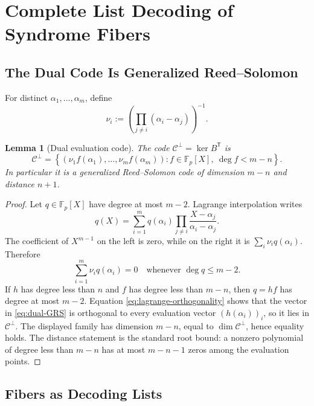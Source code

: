 \documentclass[10pt,a4paper]{amsart}
\newtheorem{lemma}[theorem]{Lemma}
\newcommand{\F}{\mathbb{F}}
\newcommand{\C}{\mathcal{C}}
\begin{document}
\section{Complete List Decoding of Syndrome Fibers}

\subsection{The Dual Code Is Generalized Reed--Solomon}

For distinct $\alpha_1,\ldots,\alpha_m$, define
\begin{equation}
   \nu_i:=\left(\prod_{j\ne i}(\alpha_i-\alpha_j)\right)^{-1}.
   \label{eq:dual-multipliers}
\end{equation}

\begin{lemma}[Dual evaluation code]
\label{lem:dual-GRS}
The code $\C^\perp=\ker B^{\mathsf T}$ is
\begin{equation}
   \C^\perp
   =\left\{(\nu_1f(\alpha_1),\ldots,\nu_mf(\alpha_m)):
       f\in\F_p[X],\ \deg f<m-n\right\}.
   \label{eq:dual-GRS}
\end{equation}
In particular it is a generalized Reed--Solomon code of dimension $m-n$ and distance $n+1$.
\end{lemma}

\begin{proof}
Let $q\in\F_p[X]$ have degree at most $m-2$.  Lagrange interpolation writes
\[
   q(X)=\sum_{i=1}^m q(\alpha_i)
        \prod_{j\ne i}\frac{X-\alpha_j}{\alpha_i-\alpha_j}.
\]
The coefficient of $X^{m-1}$ on the left is zero, while on the right it is
$\sum_i\nu_iq(\alpha_i)$.  Therefore
\begin{equation}
   \sum_{i=1}^m\nu_iq(\alpha_i)=0
   \quad\text{whenever }\deg q\le m-2.
   \label{eq:lagrange-orthogonality}
\end{equation}
If $h$ has degree less than $n$ and $f$ has degree less than $m-n$, then $q=hf$ has degree at most $m-2$.  Equation \eqref{eq:lagrange-orthogonality} shows that the vector in \cref{eq:dual-GRS} is orthogonal to every evaluation vector $(h(\alpha_i))_i$, so it lies in $\C^\perp$.  The displayed family has dimension $m-n$, equal to $\dim\C^\perp$, hence equality holds.  The distance statement is the standard root bound: a nonzero polynomial of degree less than $m-n$ has at most $m-n-1$ zeros among the evaluation points.
\end{proof}

\subsection{Fibers as Decoding Lists}
\end{document}
